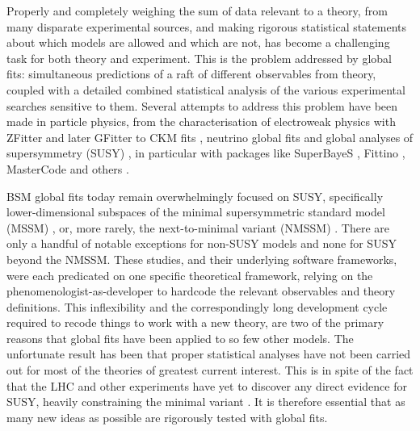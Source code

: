 \documentclass[pdftex,twocolumn,epjc3_preprint,runningheads]{svjour3}
\renewcommand{\_}{\discretionary{\underscore}{}{\underscore}}
\begin{document}
Properly and completely weighing the sum of data relevant to a theory, from many disparate experimental sources, and making rigorous statistical statements about which models are allowed and which are not, has become a challenging task for both theory and experiment.  This is the problem addressed by global fits: simultaneous predictions of a raft of different observables from theory, coupled with a detailed combined statistical analysis of the various experimental searches sensitive to them.  Several attempts to address this problem have been made in particle physics, from the characterisation of electroweak physics with \textsf{ZFitter} \cite{ZFitter} and later \textsf{GFitter} \cite{GFitter11} to CKM fits \cite{CKMFitter}, neutrino global fits \cite{Bari13,Tortola14,NuFit15} and global analyses of supersymmetry (SUSY) \cite{Baltz04,Allanach06,SFitter}, in particular with packages like \textsf{SuperBayeS} \cite{Ruiz06,2007NewAR..51..316T,2007JHEP...07..075R,Roszkowski09a,Trotta08,Martinez09,Roszkowski09b,Roszkowski10,Scott09c,BertoneLHCDD,SBCoverage,SuperbayesHiggs,Nightmare,BertoneLHCID,IC22Methods,Strege13,SuperbayesXENON100,SuperBayesGC}, \textsf{Fittino} \cite{Fittino06,Fittino,Fittino12}, \textsf{MasterCode} \cite{Buchmueller08,Buchmueller09,MasterCodemSUGRA,MasterCode11,MastercodeXENON100,Mastercode12,MastercodeHiggs,Mastercode12b,MastercodeCMSSM,Buchmueller:2014yva,Bagnaschi:2016afc,Bagnaschi:2016xfg} and others \cite{Allanach:2007qk,Abdussalam09a,Abdussalam09b,Allanach11b,Allanach11a,arXiv:1111.6098,Roszkowski12,Farmer13,arXiv:1212.4821,Fowlie13,Henrot14,Kim:2013uxa,arXiv:1402.5419,arXiv:1405.4289,arXiv:1503.08219,arXiv:1604.02102,Han:2016gvr}.

BSM global fits today remain overwhelmingly focused on SUSY, specifically lower-dimensional subspaces of the minimal supersymmetric standard model (MSSM) \cite{Strege15,Fittinocoverage,Catalan:2015cna,MasterCodeMSSM10,Mastercode15}, or, more rarely, the next-to-minimal variant (NMSSM) \cite{Balazs08,LopezFogliani:2009np,Kowalska:2012gs,Fowlie14}.  There are only a handful of notable exceptions for non-SUSY models \cite{BertoneUED,Cheung:2012xb,Arhrib:2013ela,Sming14,Chowdhury15,Liem16,LikeDM,Banerjee:2016hsk,Matsumoto:2016hbs,Cuoco:2016jqt} and none for SUSY beyond the NMSSM.  These studies, and their underlying software frameworks, were each predicated on one specific theoretical framework, relying on the phenomenologist-as-developer to hardcode the relevant observables and theory definitions.  This inflexibility and the correspondingly long development cycle required to recode things to work with a new theory, are two of the primary reasons that global fits have been applied to so few other models. The unfortunate result has been that proper statistical analyses have not been carried out for most of the theories of greatest current interest.  This is in spite of the fact that the LHC and other experiments have yet to discover any direct evidence for SUSY, heavily constraining the minimal variant \cite{Strege15,Fittinocoverage,Catalan:2015cna,MasterCodeMSSM10,Mastercode15}.  It is therefore essential that as many new ideas as possible are rigorously tested with global fits.
\end{document}

